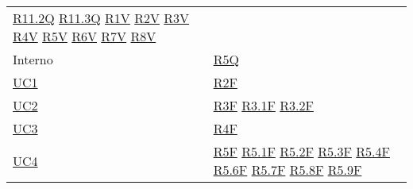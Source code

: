 \begin{center}
\begin{longtable}[!h]{m{50px} m{50px}}
        \newline \hyperref[tab:RequisitiQualita]{R11.2Q}
        \newline \hyperref[tab:RequisitiQualita]{R11.3Q}
        \newline \hyperref[tab:RequisitiVincolo]{R1V}
        \newline \hyperref[tab:RequisitiVincolo]{R2V}
        \newline \hyperref[tab:RequisitiVincolo]{R3V}
        \newline \hyperref[tab:RequisitiVincolo]{R4V}
        \newline \hyperref[tab:RequisitiVincolo]{R5V}
        \newline \hyperref[tab:RequisitiVincolo]{R6V}
        \newline \hyperref[tab:RequisitiVincolo]{R7V}
        \newline \hyperref[tab:RequisitiVincolo]{R8V}                                   \\


        Interno                           &                                             %
        \hyperref[tab:RequisitiQualita]{R5Q}                                            \\

        \hyperref[sec:UC1]{UC1}           & \hyperref[tab:RequisitiFunzionali]{R2F}     \\

        \hyperref[sec:UC2]{UC2}           & \hyperref[tab:RequisitiFunzionali]{R3F}
        \newline \hyperref[tab:RequisitiFunzionali]{R3.1F}
        \newline \hyperref[tab:RequisitiFunzionali]{R3.2F}                              \\

        \hyperref[sec:UC3]{UC3}           & \hyperref[tab:RequisitiFunzionali]{R4F}     \\

        \hyperref[sec:UC4]{UC4}           & \hyperref[tab:RequisitiFunzionali]{R5F}
        \newline \hyperref[tab:RequisitiFunzionali]{R5.1F}
        \newline \hyperref[tab:RequisitiFunzionali]{R5.2F}
        \newline \hyperref[tab:RequisitiFunzionali]{R5.3F}
        \newline \hyperref[tab:RequisitiFunzionali]{R5.4F}
        \newline \hyperref[tab:RequisitiFunzionali]{R5.6F}
        \newline \hyperref[tab:RequisitiFunzionali]{R5.7F}
        \newline \hyperref[tab:RequisitiFunzionali]{R5.8F}
        \newline \hyperref[tab:RequisitiFunzionali]{R5.9F}                              \\


\end{longtable}
\end{center}
